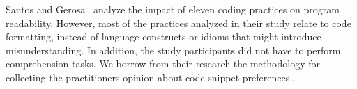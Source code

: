 



Santos and Gerosa~\cite{Santos:2018:ICP} analyze the impact of eleven coding practices on program readability. However, most of the practices analyzed in their study relate to code formatting, instead of language constructs or idioms that might introduce misunderstanding. In addition, the study participants did not have to perform comprehension tasks. We borrow from their research the methodology for collecting the practitioners opinion about code snippet preferences..


